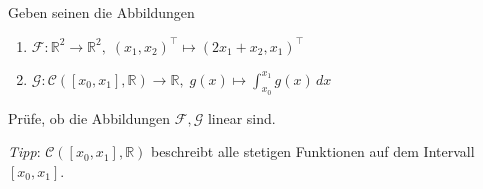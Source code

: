 \newpage

\subsubsection{}

Geben seinen die Abbildungen

\begin{enumerate}[label=\alph*)]
    \item \( \mathcal{F}: \mathbb{R}^2 \rightarrow \mathbb{R}^2,\; (x_1,x_2)^\top \mapsto (2x_1+x_2,x_1)^\top \)
    \item \( \mathcal{G}: \mathcal{C} ([x_0,x_1], \mathbb{R}) \rightarrow \mathbb{R},\; g(x) \mapsto \int_{x_0}^{x_1} g(x) \,dx \)
\end{enumerate}

Prüfe, ob die Abbildungen \( \mathcal{F,G} \) linear sind.

\vspace{1\baselineskip}

\textit{Tipp}: \( \mathcal{C} ([x_0,x_1], \mathbb{R}) \) beschreibt alle stetigen Funktionen auf dem Intervall \( [x_0,x_1] \). 

\vspace{1\baselineskip}

